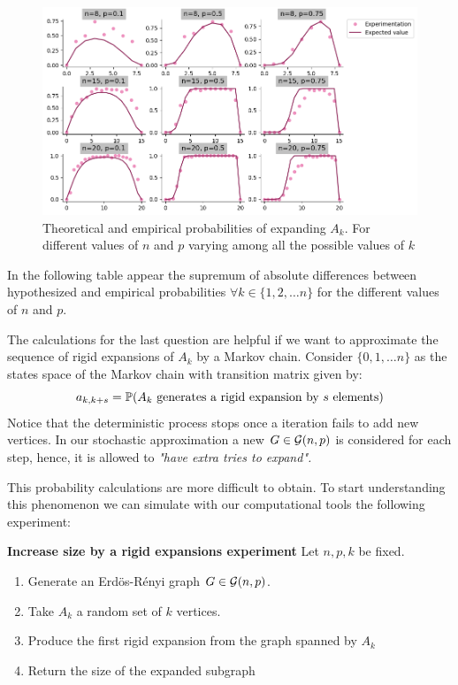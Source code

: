 \begin{figure}[h!]\label{figureExp3}
	\centering
	\includegraphics[scale=0.55]{Python/Figures/Expansion-probability.png}
	\caption{Theoretical and empirical probabilities of expanding $A_{k}$. For different values of $n$ and $p$ varying among all the possible values of $k$}
\end{figure}

In the following table appear the supremum of absolute differences between hypothesized and empirical probabilities $\forall k \in \{1,2, \dots n\}$ for the different values of $n$ and $p$.

\vspace{0.3cm}

\vspace{-0.3cm}

The calculations for the last question are helpful if we want to approximate the sequence of rigid expansions of $A_{k}$ by a Markov chain. Consider $\{0,1, \dots n\}$ as the states space of the Markov chain with transition matrix given by:
$$ a_{k,k+s} = \P(A_{k} \text{ generates a rigid expansion by } s \text{ elements})$$
Notice that the deterministic process stops once a iteration fails to add new vertices. In our stochastic approximation a new $G \in \G(n,p)$ is considered for each step, hence, it is allowed to \textit{"have extra tries to expand".}

This probability calculations are more difficult to obtain. To start understanding this phenomenon we can simulate with our computational tools the following experiment:
 
\begin{cajita}
\textbf{Increase size by a rigid expansions experiment} \hfill \break
Let $n,p,k$ be fixed.
\begin{enumerate}
\item Generate an Erdös-Rényi graph $G\in \G(n,p)$.
\item Take $A_{k}$ a random set of $k$ vertices.
\item Produce the first rigid expansion from the graph spanned by $A_{k}$
\item Return the size of the expanded subgraph
\end{enumerate}
\end{cajita}

